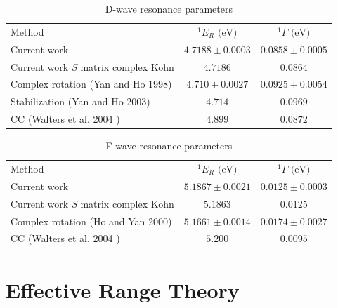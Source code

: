 \documentclass[preprint,showpacs,preprintnumbers,amsmath,amssymb,longbibliography,pra,aps]{revtex4-1}
\begin{document}
\begin{table}[H]
\begin{center}
\begin{ruledtabular}
\begin{tabular}{l c c}
Method & $^1E_R \text{ (eV)}$ & $^1\Gamma \text{ (eV)}$ \\
\colrule
Current work & $4.7188 \pm 0.0003$ & $0.0858 \pm 0.0005$ \\
Current work \emph{S} matrix complex Kohn & $4.7186$ & $0.0864$ \\
Complex rotation (Yan and Ho 1998) \cite{Ho1998} & $4.710 \pm 0.0027$ & $0.0925 \pm 0.0054$  \\
Stabilization (Yan and Ho 2003) \cite{Yan2003} & $4.714$ & $0.0969$ \\
CC (Walters et al. 2004 \cite{Walters2004}) & $4.899$ & $0.0872$ \\
\end{tabular}
\end{ruledtabular}
\caption{D-wave resonance parameters} %
\label{tab:DWaveResonances}
\end{center}
\end{table}


\begin{table}[H]
\begin{center}
\begin{ruledtabular}
\begin{tabular}{l c c}
Method & $^1E_R \text{ (eV)}$ & $^1\Gamma \text{ (eV)}$ \\
\colrule
Current work & $5.1867 \pm 0.0021$ & $0.0125 \pm 0.0003$ \\
Current work \emph{S} matrix complex Kohn & $5.1863$ & $0.0125$ \\
Complex rotation (Ho and Yan 2000) \cite{Ho2000} & $5.1661 \pm 0.0014$ & $0.0174 \pm 0.0027$  \\
CC (Walters et al. 2004 \cite{Walters2004}) & $5.200$ & $0.0095$ \\
\end{tabular}
\end{ruledtabular}
\caption{F-wave resonance parameters} %
\label{tab:FWaveResonances}
\end{center}
\end{table}



\section{Effective Range Theory}
\end{document}
